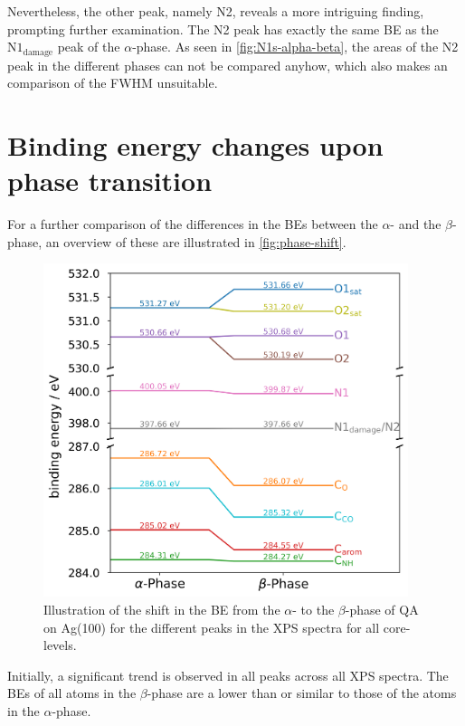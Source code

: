 Nevertheless, the other peak, namely N2, reveals a more intriguing finding, prompting further examination. The N2 peak has exactly the same \ac{BE} as the $\mathrm{N1_{damage}}$ peak of the $\alpha$-phase. As seen in \autoref{fig:N1s-alpha-beta}, the areas of the N2 peak in the different phases can not be compared anyhow, which also makes an comparison of the \ac{FWHM} unsuitable.


\cleardoublepage
\section{Binding energy changes upon phase transition}

For a further comparison of the differences in the \acp{BE} between the $\alpha$- and the $\beta$-phase, an overview of these are illustrated in \autoref{fig:phase-shift}.

\begin{figure}[H]
	\centering
	\includegraphics[width=0.95\textwidth]{images/phase-shifts.png}
	\caption{Illustration of the shift in the \ac{BE} from the $\alpha$- to the $\beta$-phase of \ac{QA} on Ag(100) for the different peaks in the \ac{XPS} spectra for all core-levels.}
	\label{fig:phase-shift}
\end{figure}

Initially, a significant trend is observed in all peaks across all \ac{XPS} spectra. The \acp{BE} of all atoms in the $\beta$-phase are a lower than or similar to those of the atoms in the $\alpha$-phase.


